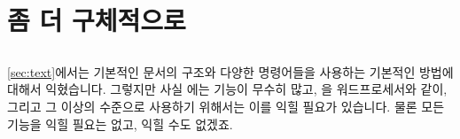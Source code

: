 
\section{좀 더 구체적으로}
\label{sec:adv}
\subsection*{}
\ref{sec:text}에서는 기본적인 문서의 구조와 다양한 명령어들을 사용하는 기본적인 방법에 대해서 익혔습니다.
그렇지만 사실 \lt 에는 기능이 무수히 많고, \lt 을 워드프로세서와 같이, 그리고 그 이상의 수준으로 사용하기 위해서는 이를 익힐 필요가 있습니다.
물론 모든 기능을 익힐 필요는 없고, 익힐 수도 없겠죠.

